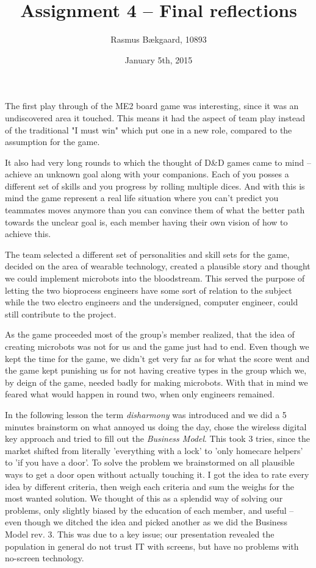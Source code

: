 \documentclass[oneside, 12pt]{article}
\title{Assignment 4 --  Final reflections}
\author{Rasmus Bækgaard, 10893}
\date{January 5th, 2015}
\begin{document}
\maketitle

The first play through  of the ME2 board game was interesting, since it was an undiscovered area it touched. 
This means it had the aspect of team play instead of the traditional "I must win" which put one in a new role, compared to the assumption for the game.

It also had very long rounds to which the thought of D\&D games came to mind -- achieve an unknown goal along with your companions. 
Each of you posses a different set of skills and you progress by rolling multiple dices. 
And with this is mind the game represent a real life situation where you can't predict you  teammates moves anymore than you can convince them of what the better path towards the unclear goal is, each member having their own vision of how to achieve this.

The team selected a different set of personalities and skill sets for the game, decided on the area of wearable technology, created a plausible story and thought we could implement microbots into the bloodstream. 
This served the purpose of letting the two bioprocess engineers have some sort of relation to the subject while the two electro engineers and the undersigned, computer engineer, could still contribute to the project.

As the game proceeded most of the group's member realized, that the idea of creating microbots was not for us and the game just had to end.
Even though we kept the time for the game, we didn't get very far as for what the score went and the game kept punishing us for not having creative types in the group which we, by deign of the game, needed badly for making microbots.
With that in mind we feared what would happen in round two, when only engineers remained.

In the following lesson the term \textit{disharmony} was introduced and we did a 5 minutes brainstorm on what annoyed us doing the day, chose the wireless digital key approach and tried to fill out the \textit{Business Model}.
This took 3 tries, since the market shifted from literally 'everything with a lock' to 'only homecare helpers' to 'if you have a door'. 
To solve the problem we brainstormed on all plausible ways to get a door open without actually touching it.
I got the idea to  rate every idea by different criteria, then weigh each criteria and sum the weighs for the most wanted solution. 
We thought of this as a splendid way of solving our problems, only slightly biased by the education of each member, and useful -- even though we ditched the idea and picked another as we did the Business Model rev. 3.
This was due to a key issue; our presentation revealed the population in general do not trust IT with screens, but have no problems with no-screen technology.
\end{document}
